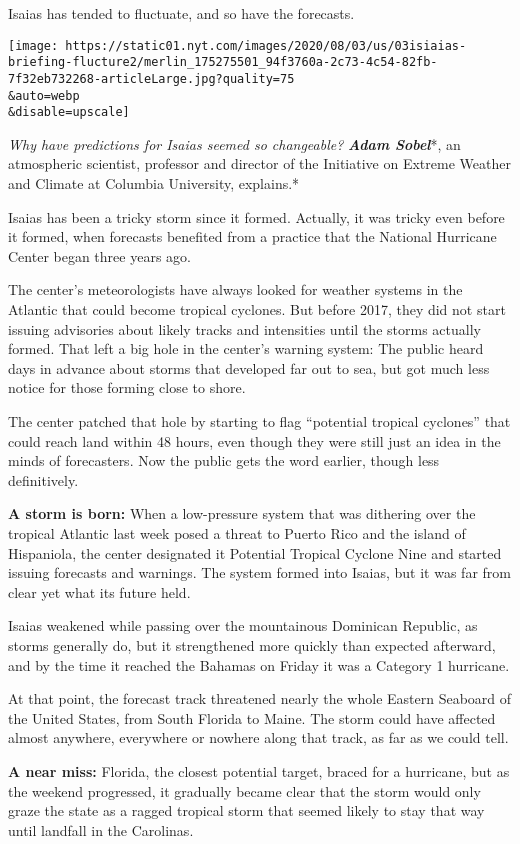 Isaias has tended to fluctuate, and so have the forecasts.

\texttt{[image: https://static01.nyt.com/images/2020/08/03/us/03isiaias-briefing-flucture2/merlin\_175275501\_94f3760a-2c73-4c54-82fb-7f32eb732268-articleLarge.jpg?quality=75\\\&auto=webp\\\&disable=upscale]}

\emph{Why have predictions for Isaias seemed so changeable?}
\emph{\textbf{Adam Sobel}}*, an atmospheric scientist, professor and
director of the Initiative on Extreme Weather and Climate at Columbia
University, explains.*

Isaias has been a tricky storm since it formed. Actually, it was tricky
even before it formed, when forecasts benefited from a practice that the
National Hurricane Center began three years ago.

The center's meteorologists have always looked for weather systems in
the Atlantic that could become tropical cyclones. But before 2017, they
did not start issuing advisories about likely tracks and intensities
until the storms actually formed. That left a big hole in the center's
warning system: The public heard days in advance about storms that
developed far out to sea, but got much less notice for those forming
close to shore.

The center patched that hole by starting to flag ``potential tropical
cyclones'' that could reach land within 48 hours, even though they were
still just an idea in the minds of forecasters. Now the public gets the
word earlier, though less definitively.

\textbf{A storm is born:} When a low-pressure system that was dithering
over the tropical Atlantic last week posed a threat to Puerto Rico and
the island of Hispaniola, the center designated it Potential Tropical
Cyclone Nine and started issuing forecasts and warnings. The system
formed into Isaias, but it was far from clear yet what its future held.

Isaias weakened while passing over the mountainous Dominican Republic,
as storms generally do, but it strengthened more quickly than expected
afterward, and by the time it reached the Bahamas on Friday it was a
Category 1 hurricane.

At that point, the forecast track threatened nearly the whole Eastern
Seaboard of the United States, from South Florida to Maine. The storm
could have affected almost anywhere, everywhere or nowhere along that
track, as far as we could tell.

\textbf{A near miss:} Florida, the closest potential target, braced for
a hurricane, but as the weekend progressed, it gradually became clear
that the storm would only graze the state as a ragged tropical storm
that seemed likely to stay that way until landfall in the Carolinas.

